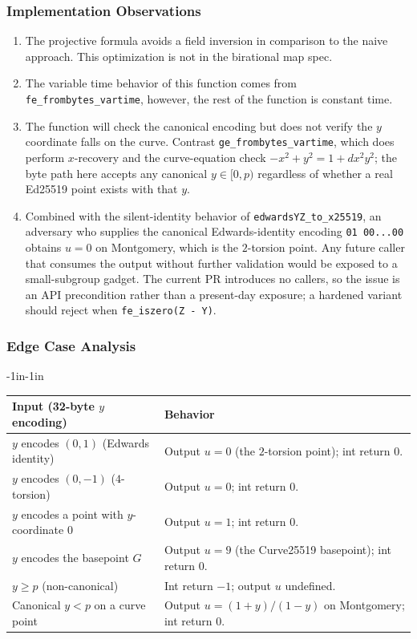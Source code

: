 \documentclass[12pt,titlepage,table]{article}
\begin{document}
\subsubsection{Implementation Observations}
\begin{enumerate}
\item The projective formula avoids a field inversion in comparison to the naive approach. This optimization is not in the birational map spec.
\item The variable time behavior of this function comes from \verb+fe_frombytes_vartime+, however, the rest of the function is constant time.
\item The function will check the canonical encoding but does not verify the $y$ coordinate falls on the curve.  Contrast \verb+ge_frombytes_vartime+, which does perform $x$-recovery and the curve-equation check $-x^2 + y^2 = 1 + d x^2 y^2$; the byte path here accepts any canonical $y \in [0, p)$ regardless of whether a real Ed25519 point exists with that $y$.
\item Combined with the silent-identity behavior of \verb+edwardsYZ_to_x25519+, an adversary who supplies the canonical Edwards-identity encoding \verb+01 00...00+ obtains $u = 0$ on Montgomery, which is the $2$-torsion point.  Any future caller that consumes the output without further validation would be exposed to a small-subgroup gadget.  The current PR introduces no callers, so the issue is an API precondition rather than a present-day exposure; a hardened variant should reject when \verb+fe_iszero(Z - Y)+.

\end{enumerate}

\subsubsection{Edge Case Analysis}
\begin{table}[htbp]
\begin{adjustwidth}{-1in}{-1in}
\centering
{
\begin{tabular}{| l | l |}
\hline
\textbf{Input (32-byte $y$ encoding)} & \textbf{Behavior} \\
\hline
\hline
$y$ encodes $(0,1)$ (Edwards identity) & Output $u = 0$ (the $2$-torsion point); int return $0$. \\
$y$ encodes $(0,-1)$ ($4$-torsion) & Output $u = 0$; int return $0$. \\
$y$ encodes a point with $y$-coordinate $0$ & Output $u = 1$; int return $0$. \\
$y$ encodes the basepoint $G$ & Output $u = 9$ (the Curve25519 basepoint); int return $0$. \\
$y \geq p$ (non-canonical) & Int return $-1$; output $u$ undefined. \\
Canonical $y < p$ on a curve point & Output $u = (1+y)/(1-y)$ on Montgomery; int return $0$. \\
\hline
\end{tabular}}
\end{adjustwidth}
\end{table}
\end{document}
